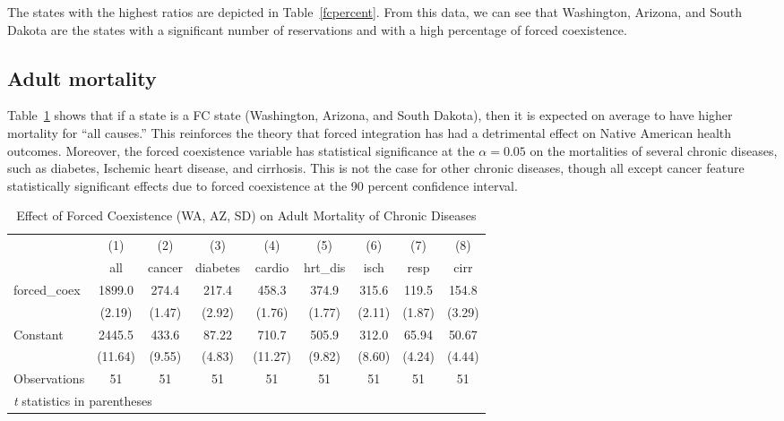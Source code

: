 \documentclass[12pt]{article}
\begin{document}
The states with the highest ratios are depicted in Table~\ref{fcpercent}.  From this data, we can see that Washington, Arizona, and South Dakota are the states with a significant number of reservations and with a high percentage of forced coexistence.



\subsection{Adult mortality}
Table~\ref{fc1} shows that if a state is a FC state (Washington, Arizona, and South Dakota), then it is expected on average to have higher mortality for ``all causes.'' 
This reinforces the theory that forced integration has had a detrimental effect on Native American health outcomes. 
Moreover, the forced coexistence variable has statistical significance at the $\alpha = 0.05$ on the mortalities of several chronic diseases, such as diabetes, Ischemic heart disease, and cirrhosis.
This is not the case for other chronic diseases, though all except cancer feature statistically significant effects due to forced coexistence at the 90 percent confidence interval.

\begin{table}[htbp]\centering \caption{Effect of Forced Coexistence (WA, AZ, SD) on Adult Mortality of Chronic Diseases\label{fc1}} \begin{tabular}{l*{8}{c}} \toprule
                    &\multicolumn{1}{c}{(1)}&\multicolumn{1}{c}{(2)}&\multicolumn{1}{c}{(3)}&\multicolumn{1}{c}{(4)}&\multicolumn{1}{c}{(5)}&\multicolumn{1}{c}{(6)}&\multicolumn{1}{c}{(7)}&\multicolumn{1}{c}{(8)}\\
                    &\multicolumn{1}{c}{all}&\multicolumn{1}{c}{cancer}&\multicolumn{1}{c}{diabetes}&\multicolumn{1}{c}{cardio}&\multicolumn{1}{c}{hrt\_dis}&\multicolumn{1}{c}{isch}&\multicolumn{1}{c}{resp}&\multicolumn{1}{c}{cirr}\\
\midrule
forced\_coex         &      1899.0&       274.4&       217.4&       458.3&       374.9&       315.6&       119.5&       154.8\\
                    &      (2.19)&      (1.47)&      (2.92)&      (1.76)&      (1.77)&      (2.11)&      (1.87)&      (3.29)\\
\addlinespace
Constant            &      2445.5&       433.6&       87.22&       710.7&       505.9&       312.0&       65.94&       50.67\\
                    &     (11.64)&      (9.55)&      (4.83)&     (11.27)&      (9.82)&      (8.60)&      (4.24)&      (4.44)\\
\midrule
Observations        &          51&          51&          51&          51&          51&          51&          51&          51\\
\bottomrule
\multicolumn{9}{l}{\footnotesize \textit{t} statistics in parentheses}\\
\end{tabular}
\end{table}
\end{document}
